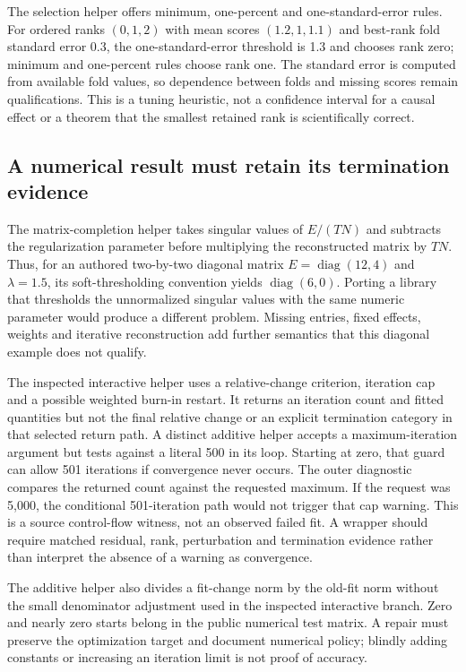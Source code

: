 The selection helper offers minimum, one-percent and one-standard-error
rules. For ordered ranks $(0,1,2)$ with mean scores $(1.2,1,1.1)$ and
best-rank fold standard error 0.3, the one-standard-error threshold is 1.3
and chooses rank zero; minimum and one-percent rules choose rank one.
The standard error is computed from available fold values, so dependence
between folds and missing scores remain qualifications. This is a tuning
heuristic, not a confidence interval for a causal effect or a theorem that
the smallest retained rank is scientifically correct.
\citep{exec24_fect_source,exec24_fect_choice}

\subsection{A numerical result must retain its termination evidence}
The matrix-completion helper takes singular values of $E/(TN)$ and
subtracts the regularization parameter before multiplying the reconstructed
matrix by $TN$. Thus, for an authored two-by-two diagonal matrix
$E=\operatorname{diag}(12,4)$ and $\lambda=1.5$, its soft-thresholding
convention yields $\operatorname{diag}(6,0)$. Porting a library that
thresholds the unnormalized singular values with the same numeric
parameter would produce a different problem. Missing entries, fixed
effects, weights and iterative reconstruction add further semantics that
this diagonal example does not qualify.~\citep{exec24_fect_source,exec24_fect_choice}

The inspected interactive helper uses a relative-change criterion,
iteration cap and a possible weighted burn-in restart. It returns an
iteration count and fitted quantities but not the final relative change
or an explicit termination category in that selected return path. A
distinct additive helper accepts a maximum-iteration argument but tests
against a literal 500 in its loop. Starting at zero, that guard can allow
501 iterations if convergence never occurs. The outer diagnostic compares
the returned count against the requested maximum. If the request was
5,000, the conditional 501-iteration path would not trigger that cap
warning. This is a source control-flow witness, not an observed failed
fit. A wrapper should require matched residual, rank, perturbation and
termination evidence rather than interpret the absence of a warning as
convergence.~\citep{exec24_fect_source,exec24_fect_choice}

The additive helper also divides a fit-change norm by the old-fit norm
without the small denominator adjustment used in the inspected
interactive branch. Zero and nearly zero starts belong in the public
numerical test matrix. A repair must preserve the optimization target and
document numerical policy; blindly adding constants or increasing an
iteration limit is not proof of accuracy.~\citep{exec24_fect_source,exec24_fect_choice}


